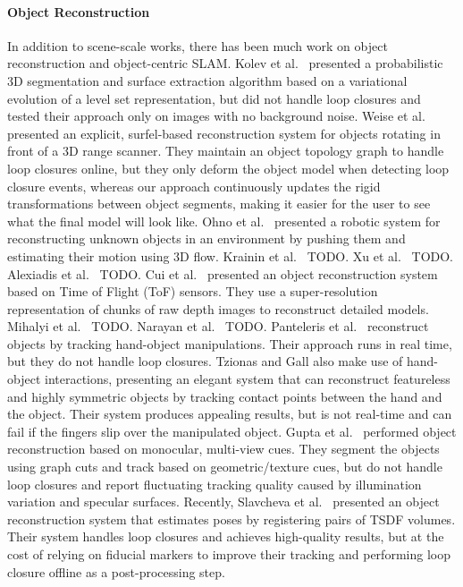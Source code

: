 \paragraph{Object Reconstruction}
In addition to scene-scale works, there has been much work on object reconstruction and object-centric SLAM. Kolev et al.\ \cite{Kolev2006} presented a probabilistic 3D segmentation and surface extraction algorithm based on a variational evolution of a level set representation, but did not handle loop closures and tested their approach only on images with no background noise. Weise et al.\ \cite{Weise2009} presented an explicit, surfel-based reconstruction system for objects rotating in front of a 3D range scanner. They maintain an object topology graph to handle loop closures online, but they only deform the object model when detecting loop closure events, whereas our approach continuously updates the rigid transformations between object segments, making it easier for the user to see what the final model will look like. Ohno et al.\ \cite{Ohno2011} presented a robotic system for reconstructing unknown objects in an environment by pushing them and estimating their motion using 3D flow. Krainin et al.\ \cite{Krainin2011IJRR} TODO. Xu et al.\ \cite{Xu2012} TODO. Alexiadis et al.\ \cite{Alexiadis2013} TODO. Cui et al.\ \cite{Cui2013} presented an object reconstruction system based on Time of Flight (ToF) sensors. They use a super-resolution representation of chunks of raw depth images to reconstruct detailed models. Mihalyi et al.\ \cite{Mihalyi2015} TODO. Narayan et al.\ \cite{Narayan2015} TODO. Panteleris et al.\ \cite{Pantaleris2015, Panteleris2015b} reconstruct objects by tracking hand-object manipulations. Their approach runs in real time, but they do not handle loop closures. Tzionas and Gall \cite{Tzionas2015} also make use of hand-object interactions, presenting an elegant system that can reconstruct featureless and highly symmetric objects by tracking contact points between the hand and the object. Their system produces appealing results, but is not real-time and can fail if the fingers slip over the manipulated object. Gupta et al.\ \cite{Gupta2016} performed object reconstruction based on monocular, multi-view cues. They segment the objects using graph cuts and track based on geometric/texture cues, but do not handle loop closures and report fluctuating tracking quality caused by illumination variation and specular surfaces. Recently, Slavcheva et al.\ \cite{slavcheva2016eccv} presented an object reconstruction system that estimates poses by registering pairs of TSDF volumes. Their system handles loop closures and achieves high-quality results, but at the cost of relying on fiducial markers to improve their tracking and performing loop closure offline as a post-processing step.

